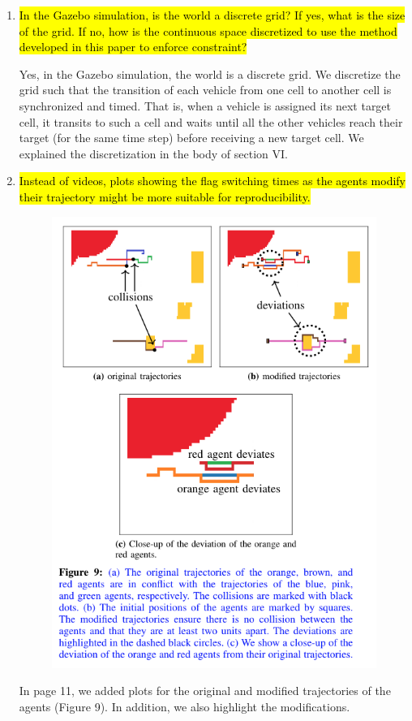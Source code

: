 \documentclass{article}[12pt]
\begin{document}
\begin{enumerate}

\item \hl{In the Gazebo simulation, is the world a discrete grid? If yes, what is the size of the grid. If no, how is the continuous space discretized to use the method developed in this paper to enforce constraint?}

Yes, in the Gazebo simulation, the world is a discrete grid. We discretize the grid such that the transition of each vehicle from one cell to another cell is synchronized and timed. That is, when a vehicle is assigned its next target cell, it transits to such a cell and waits until all the other vehicles reach their target (for the same time step) before receiving a new target cell. 
We explained the discretization in the body of section VI.

\item \hl{Instead of videos, plots showing the flag switching times as the agents modify their trajectory might be more suitable for reproducibility.}

\begin{figure}[h]
    \centering
    \includegraphics[scale=0.8]{fig9.png}
\end{figure}

In page 11, we added plots for the original and modified trajectories of the agents (Figure 9). In addition, we also highlight the modifications.

\end{enumerate}



\end{document}
